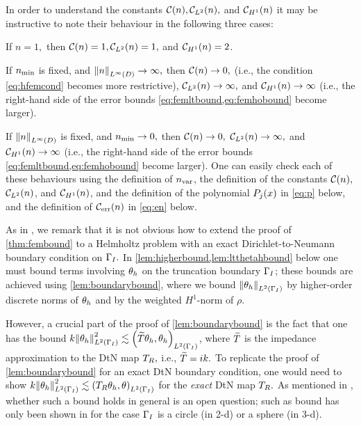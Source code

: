 In order to understand the constants $\mathcal C(n), \mathcal C_{L^{2}}(n),$ and $\mathcal C_{H^{1}}(n)$ it may be instructive to note their behaviour in the following three cases:
\bit
\item If $n=1,$ then $\mathcal C(n)=1, \mathcal C_{L^{2}}(n)=1,$ and $\mathcal C_{H^{1}}(n)=2$.
\item If $n_{\min}$ is fixed, and $\NLiD{n} \rightarrow \infty,$ then $\mathcal C(n)\rightarrow 0,$ (i.e., the condition \cref{eq:hfemcond} becomes more restrictive), $\mathcal C_{L^{2}}(n)\rightarrow \infty,$ and $\mathcal C_{H^{1}}(n)\rightarrow \infty$ (i.e., the right-hand side of the error bounds \cref{eq:femltbound,eq:femhobound} become larger).
\item If $\NLiD{n}$ is fixed, and $n_{\min} \rightarrow 0,$ then $\mathcal C(n)\rightarrow 0,$ $\mathcal C_{L^{2}}(n)\rightarrow \infty,$ and $\mathcal C_{H^{1}}(n)\rightarrow \infty$ (i.e., the right-hand side of the error bounds \cref{eq:femltbound,eq:femhobound} become larger).
  \eit
  One can easily check each of these behaviours using the definition of $n_{\mathrm{var}}$, the definition of the constants $\mathcal C(n),$ $\mathcal C_{L^{2}}(n)$, and $\mathcal C_{H^{1}}(n)$, and the definition of the polynomial $P_{j}(x)$ in \cref{eq:p} below, and the definition of $\En$ in \cref{eq:en} below.
  \ere

  As in \cite[Remark 5.4(e)]{DuWu:15}, we remark that it is not obvious how to extend the proof of \cref{thm:fembound} to a Helmholtz problem with an exact Dirichlet-to-Neumann boundary condition on $\Gamma_{I}.$ In \cref{lem:higherbound,lem:ltthetahbound} below one must bound terms involving $\theta_{h}$ on the truncation boundary $\Gamma_{I}$; these bounds are achieved using \cref{lem:boundarybound}, where we bound $\NLtGI{\thetah}$ by higher-order discrete norms of $\theta_{h}$ and by the weighted $H^1$-norm of $\rho.$

  However, a crucial part of the proof of \cref{lem:boundarybound} is the fact that one has the bound $k \NLtGI{\thetah}^2 \lesssim \IPLtGI{\DtNapprox \thetah}{\thetah}$, where $\widetilde{T}$ is the impedance approximation to the DtN map $T_{R},$ i.e., $\widetilde{T} = ik.$ To replicate the proof of \cref{lem:boundarybound} for an exact DtN boundary condition, one would need to show $k \NLtGI{\thetah}^2 \lesssim \IPLtGI{\DtN \thetah}{\theta}$ for the \emph{exact} DtN map $T_{R}.$ As mentioned in \cite[Remark 5.4(e)]{DuWu:15}, whether such a bound holds in general is an open question; such as bound has only been shown in \cite[Equation (3.4b)]{MeSa:10} for the case $\Gamma_{I}$ is a circle (in 2-d) or a sphere (in 3-d).
  \ere

